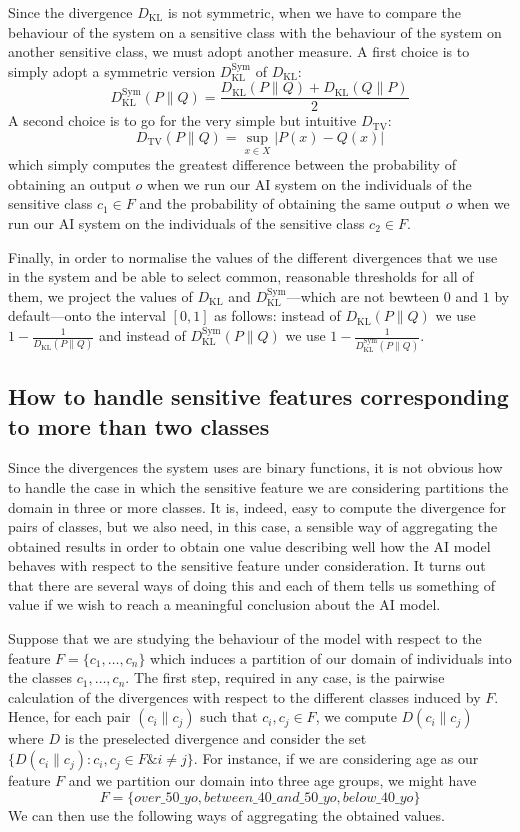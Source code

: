 \documentclass[
]{ceurart}
\begin{document}
Since the divergence $D_{\mathrm{KL}}$ is not symmetric, when we have to compare the behaviour of the system on a sensitive class with the behaviour of the system on another sensitive class, we must adopt another measure. A first choice is to simply adopt a symmetric version $D^{\mathrm{Sym}}_{\mathrm{KL}}$ of $D_{\mathrm{KL}}$:\[D^{\mathrm{Sym}}_{\mathrm{KL}}(P\parallel Q)=\frac{D_{\mathrm{KL}}(P\parallel Q)+D_{\mathrm{KL}}(Q\parallel P)}{2}\]
A second choice is to go for the very simple but intuitive $D_{\mathrm{TV}}$:\[D_{\mathrm{TV}}(P\parallel Q)= \sup _{x\in X} \vert P(x) - Q(x)\vert\]which simply computes the greatest difference between the probability of obtaining an output $o$ when we run our AI system on the individuals of the sensitive class $c_1\in F$ and the probability of obtaining the same output $o$ when we run our AI system on the individuals of the sensitive class $c_2\in F$.


{\color{red} Finally, in order to normalise the values of the different divergences that we use in the system and be able to select common, reasonable thresholds for all of them, we project the values of $D_{\mathrm{KL}}$ and $D^{\mathrm{Sym}}_{\mathrm{KL}}$---which are not bewteen $0$ and $1$ by default---onto the interval $[0,1]$ as follows: instead of $D_{\mathrm{KL}}(P\parallel Q)$ we use $1-\frac{1}{D_{\mathrm{KL}}(P\parallel Q)}$ and instead of $D^{\mathrm{Sym}}_{\mathrm{KL}}(P\parallel Q)$ we use $1-\frac{1}{D^{\mathrm{Sym}}_{\mathrm{KL}}(P\parallel Q)}$.}


\subsection{How to handle sensitive features corresponding to more than two classes}


Since the divergences the system uses are binary functions, it is not obvious how to handle the case in which the sensitive feature we are considering partitions the domain in three or more classes. It is, indeed, easy to compute the divergence for pairs of classes, but we also need, in this case, a sensible way of aggregating the obtained results in order to obtain one value describing well how the AI model behaves with respect to the sensitive feature under consideration. It turns out that there are several ways of doing this and each of them tells us something of value if we wish to reach a meaningful conclusion about the AI model.

Suppose that we are studying the behaviour of the model with respect to the feature $F=\{c_1, \ldots , c_n\}$ which induces a partition of our domain of individuals into the classes $c_1, \ldots , c_n$. The first step, required in any case, is the pairwise calculation of the divergences with respect to the different classes induced by $F$. Hence, for each pair $(c_i\parallel c_j)$ such that $c_i, c_j\in F$, we compute $D(c_i\parallel c_j) $ where $D$ is the  preselected divergence and consider the set $\{D(c_i\parallel c_j) : c_i,c_j\in F \& i\neq j\}$. For instance, if we are considering age as our feature  $F$ and we partition our domain into three age groups, we might have
\[F=\{over\_50\_yo, between\_40\_and\_50\_yo, below\_40\_yo\}\]
We can then use the following ways of aggregating the obtained values.
\end{document}
